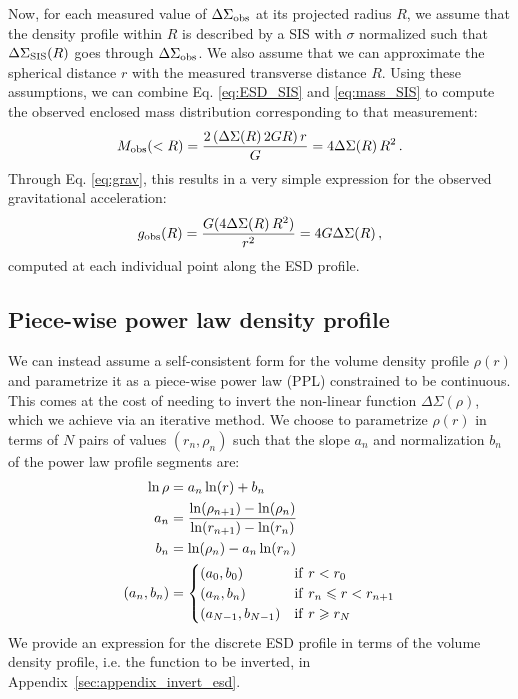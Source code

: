 \documentclass[usenatbib]{mnras}
\newcommand{\un}[1]{_{\rm #1}}
\begin{document}
Now, for each measured value of $\Delta\Sigma\un{obs}$ at its projected radius $R$, we assume that the density profile within $R$ is described by a SIS with $\sigma$ normalized such that $\Delta\Sigma\un{SIS}(R)$ goes through $\Delta\Sigma\un{obs}$. We also assume that we can approximate the spherical distance $r$ with the measured transverse distance $R$. Using these assumptions, we can combine Eq. \ref{eq:ESD_SIS} and \ref{eq:mass_SIS} to compute the observed enclosed mass distribution corresponding to that measurement:
\begin{equation}\label{eq:Mobs}
	M\un{obs}(<R) = \frac{2 \, (\Delta\Sigma(R) \, 2 G R) \, r}{G} = 4 \Delta\Sigma(R) \, R^2 \, .
\end{equation}
Through Eq. \ref{eq:grav}, this results in a very simple expression for the observed gravitational acceleration:
\begin{equation}
g\un{obs}(R) = \frac{G (4 \Delta\Sigma(R) \, R^2)}{r^2} = 4 G \Delta\Sigma(R) \, ,
\end{equation}
computed at each individual point along the ESD profile.

\subsection{Piece-wise power law density profile}
\label{sec:piece-wise_powerlaw}

We can instead assume a self-consistent form for the volume density profile $\rho(r)$ and parametrize it as a piece-wise power law (PPL) constrained to be continuous. This comes at the cost of needing to invert the non-linear function $\Delta\Sigma(\rho)$, which we achieve via an iterative method. We choose to parametrize $\rho(r)$ in terms of $N$ pairs of values $(r_n,\rho_n)$ such that the slope $a_n$ and normalization $b_n$ of the power law profile segments are:
\begin{align}
	\ln\rho &= a_n \ln(r) + b_n \\
	a_n &= \frac{\ln(\rho_{n+1})-\ln(\rho_n)}{\ln(r_{n+1})-\ln(r_n)}\\
	b_n &= \ln(\rho_n) - a_n\ln(r_n)\\
	(a_n, b_n) &=
	\begin{cases}
		(a_0, b_0) & {\rm if}\ r < r_0\\
		(a_n, b_n) & {\rm if}\ r_n \leq r < r_{n+1}\\
		(a_{N-1}, b_{N-1}) & {\rm if}\ r \geq r_N
	\end{cases}
	\label{eq:rho_piecewise_powerlaw}\end{align}
We provide an expression for the discrete ESD profile in terms of the volume density profile, i.e. the function to be inverted, in Appendix~\ref{sec:appendix_invert_esd}.
\end{document}
